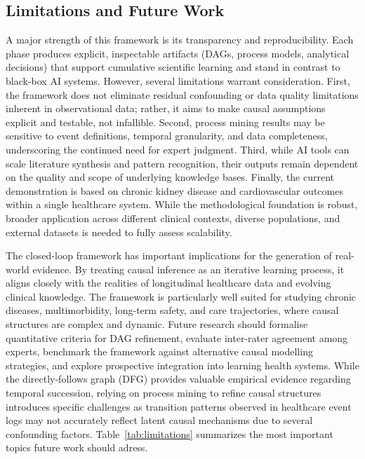 \documentclass[sn-vancouver-num]{sn-jnl}
\begin{document}
\subsection{Limitations and Future Work}

A major strength of this framework is its transparency and reproducibility. Each phase produces explicit, inspectable artifacts (DAGs, process models, analytical decisions) that support cumulative scientific learning and stand in contrast to black-box AI systems. However, several limitations warrant consideration. First, the framework does not eliminate residual confounding or data quality limitations inherent in observational data; rather, it aims to make causal assumptions explicit and testable, not infallible. Second, process mining results may be sensitive to event definitions, temporal granularity, and data completeness, underscoring the continued need for expert judgment. Third, while AI tools can scale literature synthesis and pattern recognition, their outputs remain dependent on the quality and scope of underlying knowledge bases. Finally, the current demonstration is based on chronic kidney disease and cardiovascular outcomes within a single healthcare system. While the methodological foundation is robust, broader application across different clinical contexts, diverse populations, and external datasets is needed to fully assess scalability.


The closed-loop framework has important implications for the generation of real-world evidence. By treating causal inference as an iterative learning process, it aligns closely with the realities of longitudinal healthcare data and evolving clinical knowledge. The framework is particularly well suited for studying chronic diseases, multimorbidity, long-term safety, and care trajectories, where causal structures are complex and dynamic. Future research should formalise quantitative criteria for DAG refinement, evaluate inter-rater agreement among experts, benchmark the framework against alternative causal modelling strategies, and explore prospective integration into learning health systems. While the directly-follows graph (DFG) provides valuable empirical evidence regarding temporal succession, relying on process mining to refine causal structures introduces specific challenges as transition patterns observed in healthcare event logs may not accurately reflect latent causal mechanisms due to several confounding factors. Table~\ref{tab:limitations} summarizes the most important topics future work should adress.
\end{document}
